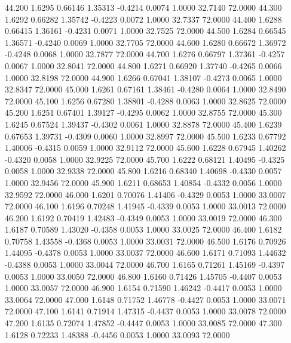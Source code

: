   44.200   1.6295   0.66146   1.35313  -0.4214   0.0074   1.0000  32.7140  72.0000
  44.300   1.6292   0.66282   1.35742  -0.4223   0.0072   1.0000  32.7337  72.0000
  44.400   1.6288   0.66415   1.36161  -0.4231   0.0071   1.0000  32.7525  72.0000
  44.500   1.6284   0.66545   1.36571  -0.4240   0.0069   1.0000  32.7705  72.0000
  44.600   1.6280   0.66672   1.36972  -0.4248   0.0068   1.0000  32.7877  72.0000
  44.700   1.6276   0.66797   1.37361  -0.4257   0.0067   1.0000  32.8041  72.0000
  44.800   1.6271   0.66920   1.37740  -0.4265   0.0066   1.0000  32.8198  72.0000
  44.900   1.6266   0.67041   1.38107  -0.4273   0.0065   1.0000  32.8347  72.0000
  45.000   1.6261   0.67161   1.38461  -0.4280   0.0064   1.0000  32.8490  72.0000
  45.100   1.6256   0.67280   1.38801  -0.4288   0.0063   1.0000  32.8625  72.0000
  45.200   1.6251   0.67401   1.39127  -0.4295   0.0062   1.0000  32.8755  72.0000
  45.300   1.6245   0.67524   1.39437  -0.4302   0.0061   1.0000  32.8878  72.0000
  45.400   1.6239   0.67653   1.39731  -0.4309   0.0060   1.0000  32.8997  72.0000
  45.500   1.6233   0.67792   1.40006  -0.4315   0.0059   1.0000  32.9112  72.0000
  45.600   1.6228   0.67945   1.40262  -0.4320   0.0058   1.0000  32.9225  72.0000
  45.700   1.6222   0.68121   1.40495  -0.4325   0.0058   1.0000  32.9338  72.0000
  45.800   1.6216   0.68340   1.40698  -0.4330   0.0057   1.0000  32.9456  72.0000
  45.900   1.6211   0.68653   1.40854  -0.4332   0.0056   1.0000  32.9592  72.0000
  46.000   1.6201   0.70076   1.41406  -0.4329   0.0053   1.0000  33.0007  72.0000
  46.100   1.6196   0.70248   1.41945  -0.4339   0.0053   1.0000  33.0013  72.0000
  46.200   1.6192   0.70419   1.42483  -0.4349   0.0053   1.0000  33.0019  72.0000
  46.300   1.6187   0.70589   1.43020  -0.4358   0.0053   1.0000  33.0025  72.0000
  46.400   1.6182   0.70758   1.43558  -0.4368   0.0053   1.0000  33.0031  72.0000
  46.500   1.6176   0.70926   1.44095  -0.4378   0.0053   1.0000  33.0037  72.0000
  46.600   1.6171   0.71093   1.44632  -0.4388   0.0053   1.0000  33.0044  72.0000
  46.700   1.6165   0.71261   1.45169  -0.4397   0.0053   1.0000  33.0050  72.0000
  46.800   1.6160   0.71426   1.45705  -0.4407   0.0053   1.0000  33.0057  72.0000
  46.900   1.6154   0.71590   1.46242  -0.4417   0.0053   1.0000  33.0064  72.0000
  47.000   1.6148   0.71752   1.46778  -0.4427   0.0053   1.0000  33.0071  72.0000
  47.100   1.6141   0.71914   1.47315  -0.4437   0.0053   1.0000  33.0078  72.0000
  47.200   1.6135   0.72074   1.47852  -0.4447   0.0053   1.0000  33.0085  72.0000
  47.300   1.6128   0.72233   1.48388  -0.4456   0.0053   1.0000  33.0093  72.0000
